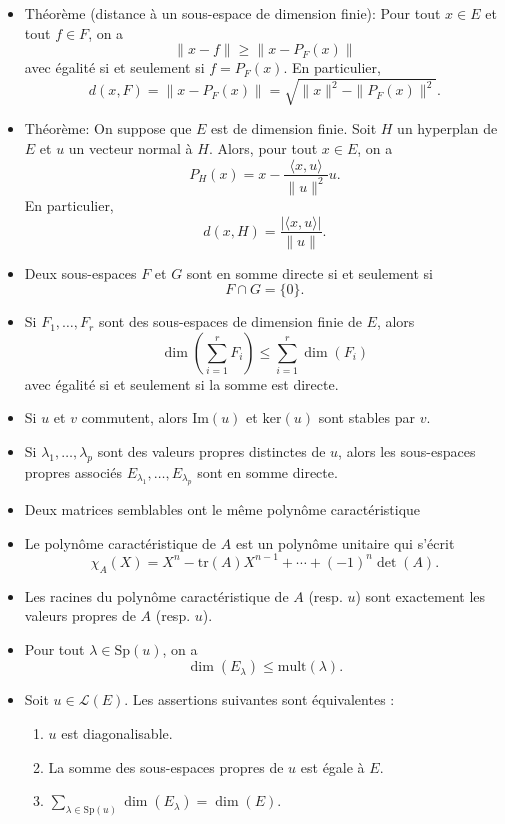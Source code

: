 \documentclass{article}
\begin{document}
\begin{itemize}[label=$\ast$]
\item Théorème (distance à un sous-espace de dimension finie): Pour tout $x \in E$ et tout $f \in F$, on a \[\| x - f \| \geq \| x - P_F(x) \| \]avec égalité si et seulement si $f = P_F(x)$. En particulier, \[d(x, F) = \| x - P_F(x) \| = \sqrt{\| x \|^2 - \| P_F(x) \|^2}.\]

\item Théorème: On suppose que $E$ est de dimension finie. Soit $H$ un hyperplan de $E$ et $u$ un vecteur normal à $H$. Alors, pour tout $x \in E$, on a \[P_H(x) = x - \frac{\langle x, u \rangle}{\| u \|^2} u.\]En particulier, \[d(x, H) = \frac{|\langle x, u \rangle|}{\| u \|}.\]

\item Deux sous-espaces $F$ et $G$ sont en somme directe si et seulement si \[F \cap G = \{0\}.\]

\item Si $F_1, \ldots, F_r$ sont des sous-espaces de dimension finie de $E$, alors \[\dim\left(\sum_{i=1}^{r} F_i\right) \leq \sum_{i=1}^{r} \dim(F_i)\]avec égalité si et seulement si la somme est directe.

\item Si $u$ et $v$ commutent, alors $\text{Im}(u)$ et $\text{ker}(u)$ sont stables par $v$.

\item Si $\lambda_1, \ldots, \lambda_p$ sont des valeurs propres distinctes de $u$, alors les sous-espaces propres associés $E_{\lambda_1}, \ldots, E_{\lambda_p}$ sont en somme directe.

\item Deux matrices semblables ont le même polynôme caractéristique

\item Le polynôme caractéristique de \(A\) est un polynôme unitaire qui s'écrit \[\chi_A(X) = X^n - \text{tr}(A)X^{n-1} + \cdots + (-1)^n\det(A).\]

\item Les racines du polynôme caractéristique de $A$ (resp. $u$) sont exactement les valeurs propres de $A$ (resp. $u$).

\item Pour tout $\lambda \in \text{Sp}(u)$, on a \[\dim(E_{\lambda}) \leq \text{mult}(\lambda).\]

\item Soit $u \in \mathcal{L}(E)$. Les assertions suivantes sont équivalentes :
\begin{enumerate}
    \item $u$ est diagonalisable.
    \item La somme des sous-espaces propres de $u$ est égale à $E$.
    \item $\sum_{\lambda \in \text{Sp}(u)} \dim(E_{\lambda}) = \dim(E)$.
\end{enumerate}


\end{itemize}
\end{document}
